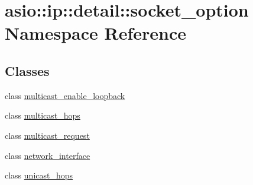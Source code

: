 \hypertarget{namespaceasio_1_1ip_1_1detail_1_1socket__option}{}\section{asio\+:\+:ip\+:\+:detail\+:\+:socket\+\_\+option Namespace Reference}
\label{namespaceasio_1_1ip_1_1detail_1_1socket__option}
\subsection*{Classes}
\begin{DoxyCompactItemize}
\item 
class \hyperlink{classasio_1_1ip_1_1detail_1_1socket__option_1_1multicast__enable__loopback}{multicast\+\_\+enable\+\_\+loopback}
\item 
class \hyperlink{classasio_1_1ip_1_1detail_1_1socket__option_1_1multicast__hops}{multicast\+\_\+hops}
\item 
class \hyperlink{classasio_1_1ip_1_1detail_1_1socket__option_1_1multicast__request}{multicast\+\_\+request}
\item 
class \hyperlink{classasio_1_1ip_1_1detail_1_1socket__option_1_1network__interface}{network\+\_\+interface}
\item 
class \hyperlink{classasio_1_1ip_1_1detail_1_1socket__option_1_1unicast__hops}{unicast\+\_\+hops}
\end{DoxyCompactItemize}
